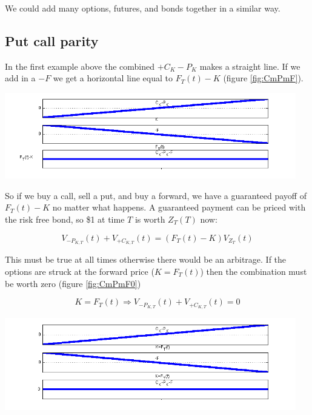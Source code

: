  
We could add many options, futures, and bonds together in a similar way. 

\subsection{Put call parity}

In the first example above the combined $+C_K-P_K$ makes a straight line. If we add in a $-F$ we get a horizontal line equal to $F_T(t)-K$ (figure \ref{fig:CmPmF}). 

  \begin{center}
\includegraphics[width=5in]{pics/CmPmF}%
\label{fig:CmPmF}%
\end{center}


So if we buy a call, sell a put, and buy a forward, we have a guaranteed payoff of $F_T(t)-K$ no matter what happens. A guaranteed payment can be priced with the risk free bond, so \$1 at time $T$ is worth $Z_T(T)$ now: 

\[V_{-P_{K,T}}(t)+ V_{+C_{K,T}}(t)  = (F_T(t)-K) V_{Z_T}(t) \]

This must be true at all times otherwise there would be an arbitrage. If the options are struck at the forward price ($K= F_T(t)$) then the combination must be worth zero (figure \ref{fig:CmPmF0})

\[K=F_T(t) \Rightarrow V_{-P_{K,T}}(t)+ V_{+C_{K,T}}(t) = 0 \]

  \begin{center}
\includegraphics[width=5in]{pics/CmPmF0}%
\label{fig:CmPmF0}%
\end{center}

